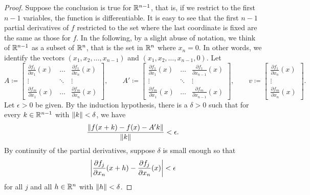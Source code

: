 \begin{proof}
Suppose the conclusion is true for ${\mathbb{R}}^{n-1}$,
that is,
if we restrict to the first $n-1$ variables, the function is differentiable.
It is easy to see that the first $n-1$
partial derivatives of $f$ restricted to the set where the last coordinate is
fixed are the same as those for $f$.
In the following, by a slight abuse of notation,
we think of ${\mathbb{R}}^{n-1}$ as a subset of ${\mathbb{R}}^n$, that is the set in ${\mathbb{R}}^n$ where $x_n = 0$.
In other words, we identify the vectors $(x_1,x_2,\ldots,x_{n-1})$ and
$(x_1,x_2,\ldots,x_{n-1},0)$.
Let
\begin{equation*}
A \coloneqq 
\begin{bmatrix}
\frac{\partial f_1}{\partial x_1}(x)
& \ldots &
\frac{\partial f_1}{\partial x_n}(x)
\\
\vdots & \ddots & \vdots
\\
\frac{\partial f_m}{\partial x_1}(x)
& \ldots &
\frac{\partial f_m}{\partial x_n}(x)
\end{bmatrix} ,
\qquad
A' \coloneqq 
\begin{bmatrix}
\frac{\partial f_1}{\partial x_1}(x)
& \ldots &
\frac{\partial f_1}{\partial x_{n-1}}(x)
\\
\vdots & \ddots & \vdots
\\
\frac{\partial f_m}{\partial x_1}(x)
& \ldots &
\frac{\partial f_m}{\partial x_{n-1}}(x)
\end{bmatrix} ,
\qquad
v \coloneqq 
\begin{bmatrix}
\frac{\partial f_1}{\partial x_n}(x)
\\
\vdots
\\
\frac{\partial f_m}{\partial x_n}(x)
\end{bmatrix} .
\end{equation*}
Let $\epsilon > 0$ be given.  By the induction hypothesis, there
is a $\delta > 0$ such that
for every $k \in {\mathbb{R}}^{n-1}$ with $\lVert {k} \rVert < \delta$, we have
\begin{equation*}
\frac{\lVert {f(x+k) - f(x) - A' k} \rVert}{\lVert {k} \rVert} < \epsilon .
\end{equation*}
By continuity of the partial derivatives, suppose $\delta$ is small
enough so that
\begin{equation*}
\left\lvert {\frac{\partial f_j}{\partial x_n}(x+h)
      - \frac{\partial f_j}{\partial x_n}(x)} \right\rvert < \epsilon
\end{equation*}
for all $j$ and all $h \in {\mathbb{R}}^n$ with $\lVert {h} \rVert < \delta$.


\end{proof}
